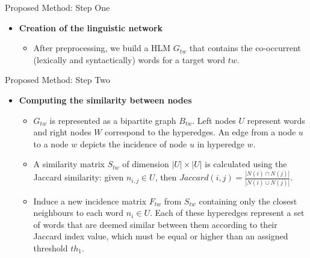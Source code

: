 \documentclass[10pt,xcolor=table]{beamer}
\begin{document}
\begin{frame}{Proposed Method: Step One}

\begin{itemize}
	\item \textbf{Creation of the linguistic network}
	\begin{itemize}
		\item After preprocessing, we build a HLM $G_{tw}$ that contains the co-occurrent (lexically and syntactically) words for a target word $tw$.
	\end{itemize}

\end{itemize}


\end{frame}

\begin{frame}{Proposed Method: Step Two}
\begin{itemize}

\item \textbf{Computing the similarity between nodes}
	\begin{itemize}
		\item $G_{tw}$ is represented as a bipartite graph $B_{tw}$. Left nodes $U$ represent words and right nodes $W$ correspond to the hyperedges. An edge from a node $u$ to a node $w$ depicts the incidence of node $u$ in hyperedge $w$.
		
		\item A similarity matrix $S_{tw}$ of dimension $|U|\times|U|$ is calculated using the Jaccard similarity: given $n_{i,j} \in U$, then $Jaccard(i,j)=\frac{|N(i)\cap N(j)|}{|N(i)\cup N(j)|}$.
	
		
		\item Induce a new incidence matrix $F_{tw}$ from $S_{tw}$ containing only the closest neighbours to each word $n_i \in U$. Each of these hyperedges represent a set of words that are deemed similar between them according to their Jaccard index value, which must be equal or higher than an assigned threshold $th_1$.
		
	\end{itemize}


\end{itemize}

\end{frame}
\end{document}
